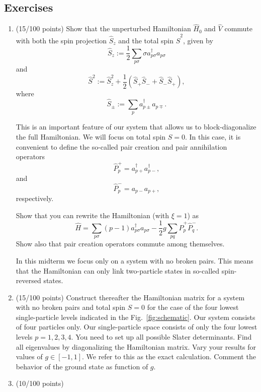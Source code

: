 \documentclass[prc]{revtex4} \usepackage[dvips]{graphicx}
\begin{document}
\subsection*{Exercises}

\begin{enumerate}
\item (15/100 points) Show that the unperturbed Hamiltonian $\hat{H}_0$ and $\hat{V}$
  commute with both the spin projection $\hat{S}_z$ and the total spin
  $\hat{S}^2$, given by
\[
  \hat{S}_z := \frac{1}{2}\sum_{p\sigma} \sigma
  a^\dag_{p\sigma}a_{p\sigma}
\]
and
\[
  \hat{S}^2 := \hat{S}_z^2 + \frac{1}{2}(\hat{S}_+\hat{S}_- +
  \hat{S}_-\hat{S}_+),
\]
where
\[
  \hat{S}_\pm := \sum_{p} a^\dag_{p\pm} a_{p\mp}.
\]

This is an important feature of our system that allows us to
block-diagonalize the full Hamiltonian. We will focus on total spin
$S=0$.  In this case, it is convenient to define the so-called pair
creation and pair annihilation operators
\[
\hat{P}^{+}_p = a^\dag_{p+}a^\dag_{p-},
\]
and
\[
\hat{P}^{-}_p = a_{p-}a_{p+},
\] 
respectively.

Show that you can rewrite the Hamiltonian (with $\xi=1$) as
\[
\hat{H}=\sum_{p\sigma}(p-1)a_{p\sigma}^{\dagger}a_{p\sigma}
-\frac{1}{2}g\sum_{pq}\hat{P}^{+}_p\hat{P}^{-}_q.
\]
Show also that pair creation operators  commute among themselves.

In this midterm we focus only on a 
system with no broken pairs. This means that the Hamiltonian can only
link two-particle states in so-called spin-reversed states.


\item (15/100 points) Construct thereafter the Hamiltonian matrix for a system with no
  broken pairs and total spin $S=0$ for the case of the four lowest
  single-particle levels indicated in the
  Fig.~\ref{fig:schematic}. Our system consists of four particles
  only.  Our single-particle space consists of only the four lowest
  levels $p=1,2,3,4$.  You need to set up all possible Slater
  determinants.  Find all eigenvalues by diagonalizing the Hamiltonian
  matrix.  Vary your results for values of $g\in [-1,1]$.  We refer to
  this as the exact calculation. Comment the behavior of the ground
  state as function of $g$.

\item  (10/100 points)


\end{enumerate}
\end{document}
